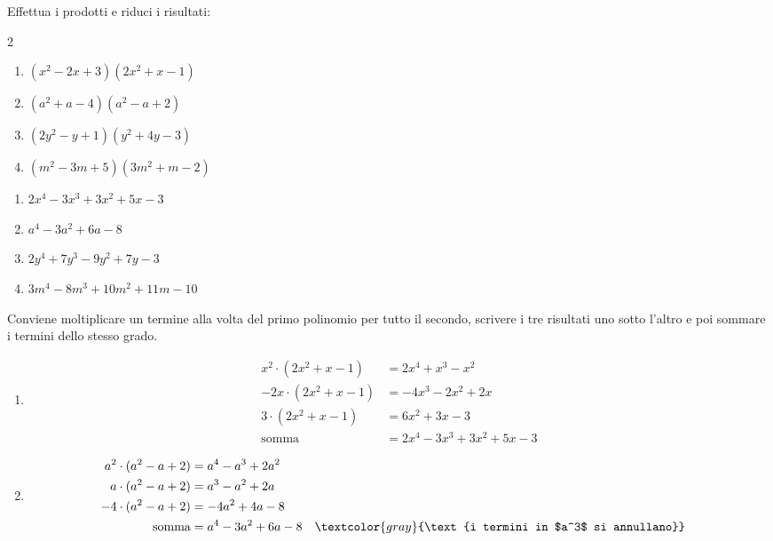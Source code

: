 \begin{question}[ID=1.5, subtitle={Prodotti e riduzione di polinomi di secondo grado}, tags={prodotti, polinomi}, difficulty=difficile]
Effettua i prodotti e riduci i risultati:
\begin{center}\begin{minipage}{0.92\linewidth}
\begin{multicols}{2}
\begin{enumerate}[leftmargin=3.2cm]
\item $(x^2 - 2x + 3)(2x^2 + x - 1)$
\item $(a^2 + a - 4)(a^2 - a + 2)$
\item $(2y^2 - y + 1)(y^2 + 4y - 3)$
\item $(m^2 - 3m + 5)(3m^2 + m - 2)$
\end{enumerate}
\end{multicols}
\end{minipage}\end{center}
\begin{solution}
\begin{enumerate}
    \item $2x^4-3x^3+3x^2+5x-3$
    \item $a^4-3a^2+6a-8$
    \item $2y^4+7y^3-9y^2+7y-3$
    \item $3m^4-8m^3+10m^2+11m-10$
\end{enumerate}
\end{solution}
\begin{explanation}
Conviene moltiplicare un termine alla volta del primo polinomio per tutto il secondo, scrivere i tre risultati uno sotto l'altro e poi sommare i termini dello stesso grado.
\begin{enumerate}
    \item \[\begin{aligned}
    x^2\cdot(2x^2+x-1) &= 2x^4+x^3-x^2\\
    -2x\cdot(2x^2+x-1) &= -4x^3-2x^2+2x\\
    3\cdot(2x^2+x-1) &= 6x^2+3x-3\\
    \text{somma} &= 2x^4-3x^3+3x^2+5x-3
    \end{aligned}\]
    \item \[\begin{aligned}
    a^2\cdot(a^2-a+2) &= a^4-a^3+2a^2\\
    a\cdot(a^2-a+2) &= a^3-a^2+2a\\
    -4\cdot(a^2-a+2) &= -4a^2+4a-8\\
    \text{somma} &= a^4-3a^2+6a-8 && \textcolor{gray}{\text{i termini in $a^3$ si annullano}}

\end{aligned}\]
\end{enumerate}
\end{explanation}
\end{question}
